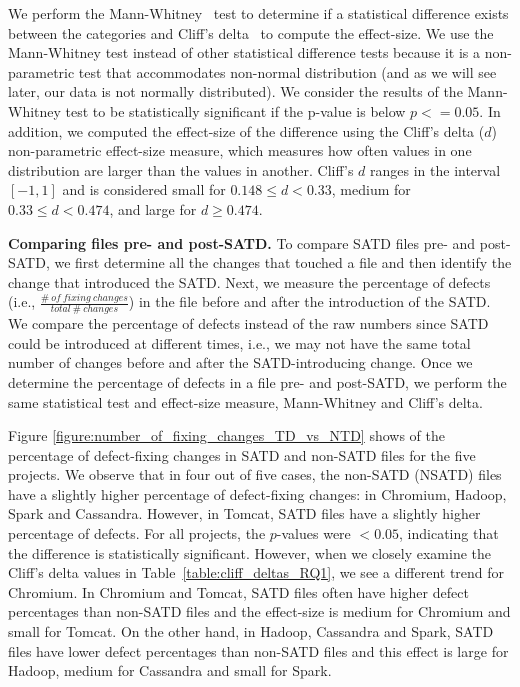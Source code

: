 We perform the Mann-Whitney~\cite{mann1947test} test to determine if a statistical difference exists between the categories and Cliff's delta~\cite{Cliff:2005} to compute the effect-size. We use the Mann-Whitney test instead of other statistical difference tests because it is a non-parametric test that accommodates non-normal distribution (and as we will see later, our data is not normally distributed). We consider the results of the Mann-Whitney test to be statistically significant if the p-value is below $p <= 0.05$. In addition, we computed the effect-size of the difference using the Cliff's delta ($d$) non-parametric effect-size measure, which measures how often values in one distribution are larger than the values in another. Cliff's $d$ ranges in  the interval $[-1,1]$ and is considered small for $0.148 \le d < 0.33$, medium for $0.33 \le d < 0.474$, and large for $d \ge 0.474$.




\noindent\textbf{Comparing files pre- and post-SATD.} To compare SATD files pre- and post-SATD, we first determine all the changes that touched a file and then identify the change that introduced the SATD. Next, we measure the percentage of defects (i.e., $\frac{\#~of~fixing~changes}{total~\#~changes}$) in the file before and after the introduction of the SATD. We compare the percentage of defects instead of the raw numbers since SATD could be introduced at different times, i.e., we may not have the same total number of changes before and after the SATD-introducing change. Once we determine the percentage of defects in a file pre- and post-SATD, we perform the same statistical test and effect-size measure, \ie{} Mann-Whitney and Cliff's delta.


 Figure \ref{figure:number_of_fixing_changes_TD_vs_NTD} shows  of the percentage of defect-fixing changes in SATD and non-SATD files for the five projects. We observe that in four out of five cases, the non-SATD (NSATD) files have a slightly higher percentage of defect-fixing changes: in Chromium, Hadoop, Spark and Cassandra. However, in Tomcat, SATD files have a slightly higher percentage of defects. For all projects, the $p$-values were $<0.05$, indicating that the difference is statistically significant. However, when we closely examine the Cliff's delta values in Table~\ref{table:cliff_deltas_RQ1}, we see a different trend for Chromium. In Chromium and Tomcat, SATD files often have higher defect percentages than non-SATD files and the effect-size is medium for Chromium and small for Tomcat. On the other hand, in Hadoop, Cassandra and Spark, SATD files have lower defect percentages than non-SATD files and this effect is large for Hadoop, medium for Cassandra and small for Spark.

